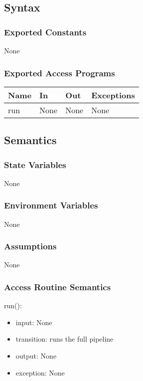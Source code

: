 \documentclass[12pt, titlepage]{article}
\begin{document}
\subsection{Syntax}

\subsubsection{Exported Constants}

None

\subsubsection{Exported Access Programs}

\begin{center}
\begin{tabular}{p{3cm} p{4cm} p{4cm} p{3cm}}
\hline
\textbf{Name} & \textbf{In} & \textbf{Out} & \textbf{Exceptions} \\
\hline
run & None & None & None \\
\hline
\end{tabular}
\end{center}

\subsection{Semantics}

\subsubsection{State Variables}

None

\subsubsection{Environment Variables}

None

\subsubsection{Assumptions}

None

\subsubsection{Access Routine Semantics}

\noindent run():
\begin{itemize}
\item input: None
\item transition: runs the full pipeline
\item output: None
\item exception: None
\end{itemize}
\end{document}
